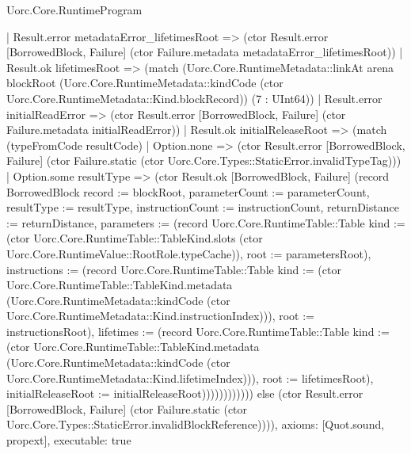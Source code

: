 \begin{lexlean}{Uorc.Core.RuntimeProgram}
\begin{semanticmodule}
{                  | Result.error metadataError_lifetimesRoot => (ctor Result.error [BorrowedBlock, Failure] (ctor Failure.metadata metadataError_lifetimesRoot))
                  | Result.ok lifetimesRoot => (match (Uorc.Core.RuntimeMetadata::linkAt arena blockRoot (Uorc.Core.RuntimeMetadata::kindCode (ctor Uorc.Core.RuntimeMetadata::Kind.blockRecord)) (7 : UInt64))
                    | Result.error initialReadError => (ctor Result.error [BorrowedBlock, Failure] (ctor Failure.metadata initialReadError))
                    | Result.ok initialReleaseRoot => (match (typeFromCode resultCode)
                      | Option.none => (ctor Result.error [BorrowedBlock, Failure] (ctor Failure.static (ctor Uorc.Core.Types::StaticError.invalidTypeTag)))
                      | Option.some resultType => (ctor Result.ok [BorrowedBlock, Failure] (record BorrowedBlock {record := blockRoot, parameterCount := parameterCount, resultType := resultType, instructionCount := instructionCount, returnDistance := returnDistance, parameters := (record Uorc.Core.RuntimeTable::Table {kind := (ctor Uorc.Core.RuntimeTable::TableKind.slots (ctor Uorc.Core.RuntimeValue::RootRole.typeCache)), root := parametersRoot}), instructions := (record Uorc.Core.RuntimeTable::Table {kind := (ctor Uorc.Core.RuntimeTable::TableKind.metadata (Uorc.Core.RuntimeMetadata::kindCode (ctor Uorc.Core.RuntimeMetadata::Kind.instructionIndex))), root := instructionsRoot}), lifetimes := (record Uorc.Core.RuntimeTable::Table {kind := (ctor Uorc.Core.RuntimeTable::TableKind.metadata (Uorc.Core.RuntimeMetadata::kindCode (ctor Uorc.Core.RuntimeMetadata::Kind.lifetimeIndex))), root := lifetimesRoot}), initialReleaseRoot := initialReleaseRoot})))))))))))) else (ctor Result.error [BorrowedBlock, Failure] (ctor Failure.static (ctor Uorc.Core.Types::StaticError.invalidBlockReference)))),
  axioms: [Quot.sound, propext],
  executable: true
}


\end{semanticmodule}
\end{lexlean}
